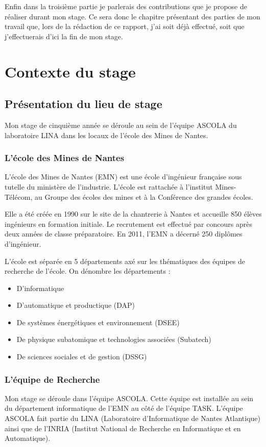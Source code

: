 \documentclass[a4paper, 11pt]{report}
\begin{document}
Enfin dans la troisième partie je parlerais des contributions que je propose de réaliser durant mon stage. Ce sera donc le chapitre présentant des parties de mon travail que, lors de la rédaction de ce rapport, j'ai soit déjà effectué, soit que j'effectuerais d'ici la fin de mon stage.

\chapter{Contexte du stage}
\section{Présentation du lieu de stage}
Mon stage de cinquième année se déroule au sein de l’équipe ASCOLA du laboratoire LINA dans les locaux de l’école des Mines de Nantes.
\subsection{L'école des Mines de Nantes}
L’école des Mines de Nantes (EMN) est une école d’ingénieur française sous tutelle du ministère de l’industrie. L’école est rattachée à l’institut Mines-Télécom, au Groupe des écoles des mines et à la Conférence des grandes écoles.

Elle a été créée en 1990 sur le site de la chantrerie à Nantes et accueille 850 élèves ingénieurs en formation initiale. Le recrutement est effectué par concours après deux années de classe préparatoire. En 2011, l’EMN a décerné 250 diplômes d’ingénieur.

L’école est séparée en 5 départements axé sur les thématiques des équipes de recherche de l'école. On dénombre les départements :
\begin{itemize}
	\item D'informatique
	\item D'automatique et productique (DAP)
	\item De systèmes énergétiques et environnement (DSEE)
	\item De physique subatomique et technologies associées (Subatech)
	\item De sciences sociales et de gestion (DSSG)
\end{itemize}

\subsection{L'équipe de Recherche}
Mon stage se déroule dans l'équipe ASCOLA. Cette équipe est installée au sein du département informatique de l’EMN au côté de l'équipe TASK. L'équipe ASCOLA fait partie du LINA (Laboratoire d'Informatique de Nantes Atlantique) ainsi que de l'INRIA (Institut National de Recherche en Informatique et en Automatique).
\end{document}

